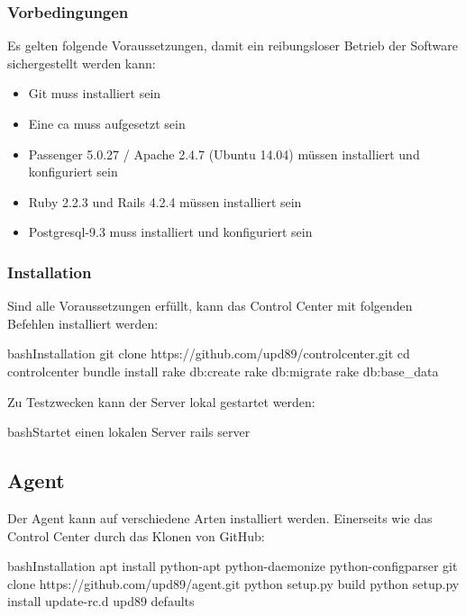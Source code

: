 \subsubsection*{Vorbedingungen}

Es gelten folgende Voraussetzungen, damit ein reibungsloser Betrieb der Software sichergestellt werden kann:

\begin{itemize}
    \item Git muss installiert sein
    \item Eine \gls{ca} muss aufgesetzt sein
    \item Passenger 5.0.27 / Apache 2.4.7 (Ubuntu 14.04) müssen installiert und konfiguriert sein
    \item Ruby 2.2.3 und Rails 4.2.4 müssen installiert sein
    \item Postgresql-9.3 muss installiert und konfiguriert sein
\end{itemize}


\subsubsection*{Installation}

Sind alle Voraussetzungen erfüllt, kann das Control Center mit folgenden Befehlen installiert werden:

\begin{srclst}[label=lst:cc:installation]{bash}{Installation}
git clone https://github.com/upd89/controlcenter.git
cd controlcenter
bundle install
rake db:create
rake db:migrate
rake db:base_data
\end{srclst}

Zu Testzwecken kann der Server lokal gestartet werden:

\begin{srclst}[label=lst:cc:localtest]{bash}{Startet einen lokalen Server}
rails server
\end{srclst}


\subsection*{Agent}

Der Agent kann auf verschiedene Arten installiert werden. Einerseits wie das Control Center durch das Klonen von GitHub:

\begin{srclst}[label=lst:agent:installation]{bash}{Installation}
apt install python-apt python-daemonize python-configparser
git clone https://github.com/upd89/agent.git
python setup.py build
python setup.py install
update-rc.d upd89 defaults
\end{srclst}

